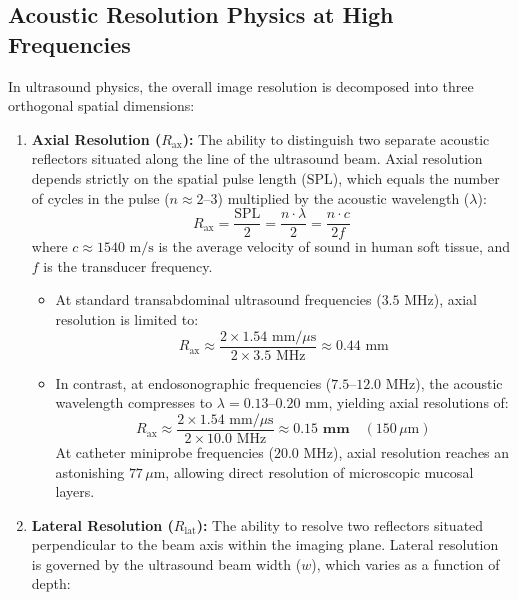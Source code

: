 \documentclass[11pt,a4paper]{article}
\begin{document}
\subsection{Acoustic Resolution Physics at High Frequencies}
In ultrasound physics, the overall image resolution is decomposed into three orthogonal spatial dimensions:
\begin{enumerate}[leftmargin=2em]
    \item \textbf{Axial Resolution ($R_{\text{ax}}$):} The ability to distinguish two separate acoustic reflectors situated along the line of the ultrasound beam. Axial resolution depends strictly on the spatial pulse length ($\text{SPL}$), which equals the number of cycles in the pulse ($n \approx 2\text{--}3$) multiplied by the acoustic wavelength ($\lambda$):
    \begin{equation}
        R_{\text{ax}} = \frac{\text{SPL}}{2} = \frac{n \cdot \lambda}{2} = \frac{n \cdot c}{2 f}
    \end{equation}
    where $c \approx 1540\text{ m/s}$ is the average velocity of sound in human soft tissue, and $f$ is the transducer frequency. 
    \begin{itemize}
        \item At standard transabdominal ultrasound frequencies ($3.5\text{ MHz}$), axial resolution is limited to:
        \begin{equation}
            R_{\text{ax}} \approx \frac{2 \times 1.54\text{ mm}/\mu\text{s}}{2 \times 3.5\text{ MHz}} \approx 0.44\text{ mm}
        \end{equation}
        \item In contrast, at endosonographic frequencies ($7.5\text{--}12.0\text{ MHz}$), the acoustic wavelength compresses to $\lambda = 0.13\text{--}0.20\text{ mm}$, yielding axial resolutions of:
        \begin{equation}
            R_{\text{ax}} \approx \frac{2 \times 1.54\text{ mm}/\mu\text{s}}{2 \times 10.0\text{ MHz}} \approx \mathbf{0.15\text{ mm}} \quad (150\,\mu\text{m})
        \end{equation}
        At catheter miniprobe frequencies ($20.0\text{ MHz}$), axial resolution reaches an astonishing $77\,\mu\text{m}$, allowing direct resolution of microscopic mucosal layers.
    \end{itemize}
    \item \textbf{Lateral Resolution ($R_{\text{lat}}$):} The ability to resolve two reflectors situated perpendicular to the beam axis within the imaging plane. Lateral resolution is governed by the ultrasound beam width ($w$), which varies as a function of depth:

\end{enumerate}
\end{document}
